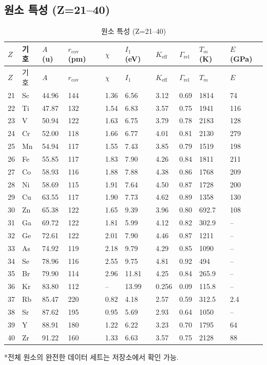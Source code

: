 \documentclass[12pt,a4paper]{article}
\newcommand{\Keff}{K_{\mathrm{eff}}}
\begin{document}
	\subsection*{원소 특성 (Z=21–40)}
	
	\begin{longtable}{p{0.6cm}p{1.2cm}p{1.2cm}p{1.2cm}p{1.2cm}p{1.2cm}p{1.5cm}p{1.2cm}p{1.2cm}p{1.2cm}}
		\caption{원소 특성 (Z=21–40)} \label{tab:elem-data-21to40} \\
		\toprule
		\(Z\) & 기호 & \(A\) (u) & \(r_{\text{cov}}\) (pm) & \(\chi\) & \(I_1\) (eV) & \(\Keff\) & \(\Gamma_{\text{rel}}\) & \(T_m\) (K) & \(E\) (GPa) \\
		\midrule
		\endfirsthead
		\toprule
		\(Z\) & 기호 & \(A\) & \(r_{\text{cov}}\) & \(\chi\) & \(I_1\) & \(\Keff\) & \(\Gamma_{\text{rel}}\) & \(T_m\) & \(E\) \\
		\midrule
		\endhead
		21 & Sc & 44.96 & 144 & 1.36 & 6.56 & 3.12 & 0.69 & 1814 & 74 \\
		22 & Ti & 47.87 & 132 & 1.54 & 6.83 & 3.57 & 0.75 & 1941 & 116 \\
		23 & V  & 50.94 & 122 & 1.63 & 6.75 & 3.79 & 0.78 & 2183 & 128 \\
		24 & Cr & 52.00 & 118 & 1.66 & 6.77 & 4.01 & 0.81 & 2130 & 279 \\
		25 & Mn & 54.94 & 117 & 1.55 & 7.43 & 3.85 & 0.79 & 1519 & 198 \\
		26 & Fe & 55.85 & 117 & 1.83 & 7.90 & 4.26 & 0.84 & 1811 & 211 \\
		27 & Co & 58.93 & 116 & 1.88 & 7.88 & 4.38 & 0.86 & 1768 & 209 \\
		28 & Ni & 58.69 & 115 & 1.91 & 7.64 & 4.50 & 0.87 & 1728 & 200 \\
		29 & Cu & 63.55 & 117 & 1.90 & 7.73 & 4.62 & 0.89 & 1358 & 130 \\
		30 & Zn & 65.38 & 122 & 1.65 & 9.39 & 3.96 & 0.80 & 692.7 & 108 \\
		31 & Ga & 69.72 & 122 & 1.81 & 5.99 & 4.12 & 0.82 & 302.9 & – \\
		32 & Ge & 72.61 & 122 & 2.01 & 7.90 & 4.46 & 0.87 & 1211 & – \\
		33 & As & 74.92 & 119 & 2.18 & 9.79 & 4.29 & 0.85 & 1090 & – \\
		34 & Se & 78.96 & 116 & 2.55 & 9.75 & 4.81 & 0.92 & 494 & – \\
		35 & Br & 79.90 & 114 & 2.96 & 11.81 & 4.25 & 0.84 & 265.9 & – \\
		36 & Kr & 83.80 & 112 & –    & 13.99 & 0.256 & 0.09 & 115.8 & – \\
		37 & Rb & 85.47 & 220 & 0.82 & 4.18 & 2.57 & 0.59 & 312.5 & 2.4 \\
		38 & Sr & 87.62 & 195 & 0.95 & 5.69 & 2.93 & 0.64 & 1050 & – \\
		39 & Y  & 88.91 & 180 & 1.22 & 6.22 & 3.23 & 0.70 & 1795 & 64 \\
		40 & Zr & 91.22 & 160 & 1.33 & 6.63 & 3.57 & 0.75 & 2128 & 88 \\
		\bottomrule
	\end{longtable}
	*전체 원소의 완전한 데이터 세트는 저장소에서 확인 가능.
	
\end{document}
